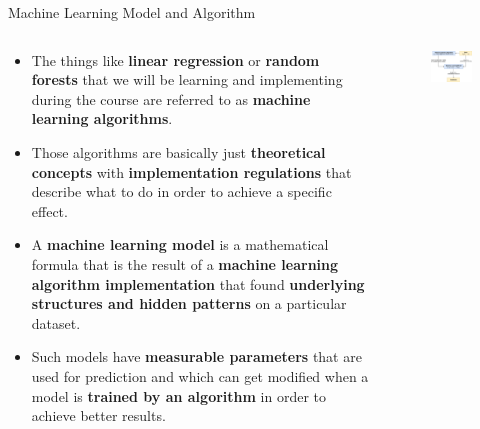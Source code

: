 \documentclass[document.tex]{subfiles}
\begin{document}
    \begin{frame}{Machine Learning Model and Algorithm}
        \begin{columns}
            \begin{column}{.6\textwidth}
                \begin{itemize}
                    \item The things like \textbf{linear regression} or \textbf{random forests} that we will be learning and implementing during the course are referred to as \textbf{machine learning algorithms}.
                    \item Those algorithms are basically just \textbf{theoretical concepts} with \textbf{implementation regulations} that describe what to do in order to achieve a specific effect.
                    \item A \textbf{machine learning model} is a mathematical formula that is the result of a \textbf{machine learning algorithm implementation} that found \textbf{underlying structures and hidden patterns} on a particular dataset.
                    \item Such models have \textbf{measurable parameters} that are used for prediction and which can get modified when a model is \textbf{trained by an algorithm} in order to achieve better results.  
                \end{itemize}
            \end{column}
            \begin{column}{.4\textwidth}
                \begin{figure}
                    \label{fig:machine-learning-model}
                    \includegraphics[width=\textwidth]{figures/drawio/machine-learning-model.png}
                \end{figure}
            \end{column}
        \end{columns}
    \end{frame}
\end{document}
